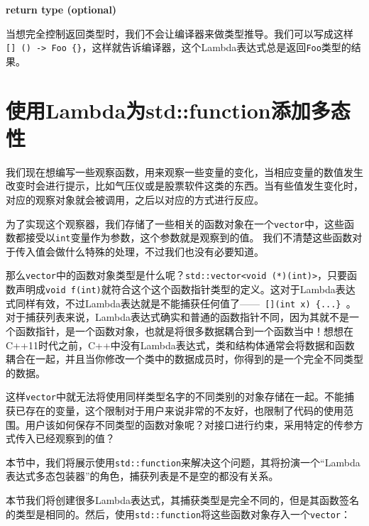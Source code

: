 \textbf{return type (optional)}

当想完全控制返回类型时，我们不会让编译器来做类型推导。我们可以写成这样\texttt{[] () -> Foo \{\}}，这样就告诉编译器，这个Lambda表达式总是返回\texttt{Foo}类型的结果。


\section{使用Lambda为std::function添加多态性}

我们现在想编写一些观察函数，用来观察一些变量的变化，当相应变量的数值发生改变时会进行提示，比如气压仪或是股票软件这类的东西。当有些值发生变化时，对应的观察对象就会被调用，之后以对应的方式进行反应。

为了实现这个观察器，我们存储了一些相关的函数对象在一个\texttt{vector}中，这些函数都接受以\texttt{int}变量作为参数，这个参数就是观察到的值。 我们不清楚这些函数对于传入值会做什么特殊的处理，不过我们也没有必要知道。

那么\texttt{vector}中的函数对象类型是什么呢？\texttt{std::vector<void (*)(int)>}，只要函数声明成\texttt{void f(int)}就符合这个这个函数指针类型的定义。这对于Lambda表达式同样有效，不过Lambda表达就是不能捕获任何值了——\texttt{ [](int x) \{...\} }。对于捕获列表来说，Lambda表达式确实和普通的函数指针不同，因为其就不是一个函数指针，是一个函数对象，也就是将很多数据耦合到一个函数当中！想想在C++11时代之前，C++中没有Lambda表达式，类和结构体通常会将数据和函数耦合在一起，并且当你修改一个类中的数据成员时，你得到的是一个完全不同类型的数据。

这样\texttt{vector}中就无法将使用同样类型名字的不同类别的对象存储在一起。不能捕获已存在的变量，这个限制对于用户来说非常的不友好，也限制了代码的使用范围。用户该如何保存不同类型的函数对象呢？对接口进行约束，采用特定的传参方式传入已经观察到的值？

本节中，我们将展示使用\texttt{std::function}来解决这个问题，其将扮演一个“Lambda表达式多态包装器”的角色，捕获列表是不是空的都没有关系。


本节我们将创建很多Lambda表达式，其捕获类型是完全不同的，但是其函数签名的类型是相同的。然后，使用\texttt{std::function}将这些函数对象存入一个\texttt{vector}：


